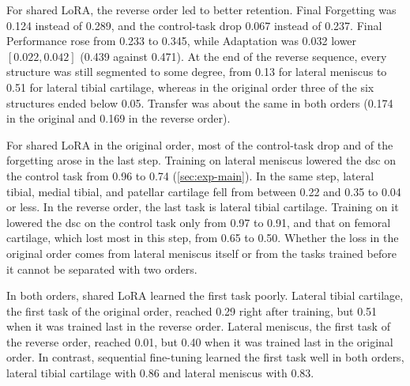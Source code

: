 For shared LoRA, the reverse order led to better retention.
Final Forgetting was 0.124 instead of 0.289, and the control-task drop 0.067 instead of 0.237.
Final Performance rose from 0.233 to 0.345, while Adaptation was 0.032 lower $[0.022, 0.042]$ (0.439 against 0.471).
At the end of the reverse sequence, every structure was still segmented to some degree, from 0.13 for lateral meniscus to 0.51 for lateral tibial cartilage, whereas in the original order three of the six structures ended below 0.05.
Transfer was about the same in both orders (0.174 in the original and 0.169 in the reverse order).

For shared LoRA in the original order, most of the control-task drop and of the forgetting arose in the last step.
Training on lateral meniscus lowered the \gls{dsc} on the control task from 0.96 to 0.74 (\cref{sec:exp-main}).
In the same step, lateral tibial, medial tibial, and patellar cartilage fell from between 0.22 and 0.35 to 0.04 or less.
In the reverse order, the last task is lateral tibial cartilage.
Training on it lowered the \gls{dsc} on the control task only from 0.97 to 0.91, and that on femoral cartilage, which lost most in this step, from 0.65 to 0.50.
Whether the loss in the original order comes from lateral meniscus itself or from the tasks trained before it cannot be separated with two orders.

In both orders, shared LoRA learned the first task poorly.
Lateral tibial cartilage, the first task of the original order, reached 0.29 right after training, but 0.51 when it was trained last in the reverse order.
Lateral meniscus, the first task of the reverse order, reached 0.01, but 0.40 when it was trained last in the original order.
In contrast, sequential fine-tuning learned the first task well in both orders, lateral tibial cartilage with 0.86 and lateral meniscus with 0.83.


